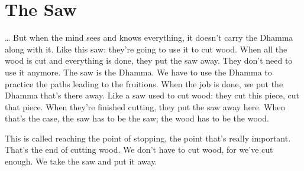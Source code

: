 \clearpage

\section{The Saw}

\ldots{} But when the mind sees and knows everything, it doesn't carry the Dhamma along with it. Like this saw: they're going to use it to cut wood. When all the wood is cut and everything is done, they put the saw away. They don't need to use it anymore. The saw is the Dhamma. We have to use the Dhamma to practice the paths leading to the fruitions. When the job is done, we put the Dhamma that's there away. Like a saw used to cut wood: they cut this piece, cut that piece. When they're finished cutting, they put the saw away here. When that's the case, the saw has to be the saw; the wood has to be the wood. 

This is called reaching the point of stopping, the point that's really important. That's the end of cutting wood. We don't have to cut wood, for we've cut enough. We take the saw and put it away.
